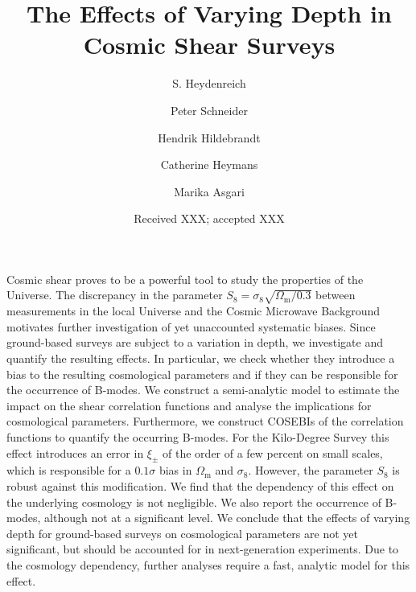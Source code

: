 \documentclass[referee]{aa} %
\renewcommand{\[}{\begin{equation}}
\renewcommand{\]}{\end{equation}}
\renewcommand{\rm}{\mathrm}
\begin{document}
 


   \title{The Effects of Varying Depth in Cosmic Shear Surveys}


   \author{S. Heydenreich%
          \and Peter Schneider 
          \and Hendrik Hildebrandt
          \and Catherine Heymans 
          \and Marika Asgari
          }

   \date{Received XXX; accepted XXX}

  \abstract
   {Cosmic shear proves to be a powerful tool to study the properties of the Universe. The discrepancy in the parameter $S_8 = \sigma_8\sqrt{\Omega_{\rm{m}}/0.3}$ between measurements in the local Universe and the Cosmic Microwave Background motivates further investigation of yet unaccounted systematic biases. 
   Since ground-based surveys are subject to a variation in depth, we investigate and quantify the resulting effects. In particular, we check whether they introduce a bias to the resulting cosmological parameters and if they can be responsible for the occurrence of B-modes.
   We construct a semi-analytic model to estimate the impact on the shear correlation functions and analyse the implications for cosmological parameters. Furthermore, we construct COSEBIs of the correlation functions to quantify the occurring B-modes.
   For the Kilo-Degree Survey this effect introduces an error in $\xi_\pm$ of the order of a few percent on small scales, which is responsible for a $0.1\sigma$ bias in $\Omega_{\rm m}$ and $\sigma_8$. However, the parameter $S_8$ is robust against this modification. We find that the dependency of this effect on the underlying cosmology is not negligible. We also report the occurrence of B-modes, although not at a significant level.
   We conclude that the effects of varying depth for ground-based surveys on cosmological parameters are not yet significant, but should be accounted for in next-generation experiments. Due to the cosmology dependency, further analyses require a fast, analytic model for this effect.}
\end{document}
